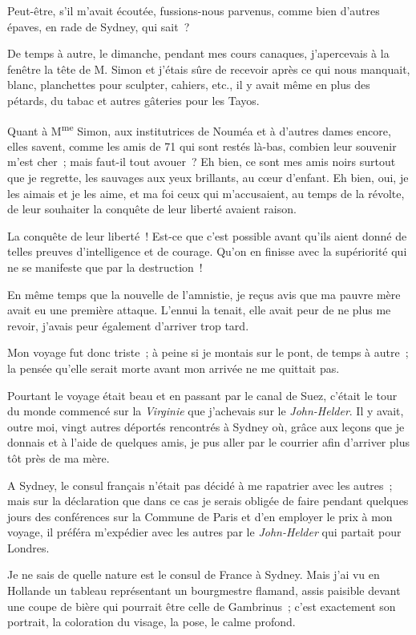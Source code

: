 \documentclass[french,twoside]{book} %
\begin{document}
Peut-être, s’il m’avait écoutée, fussions-nous parvenus, comme bien d’autres épaves, en rade de Sydney, qui sait ?\par
De temps à autre, le dimanche, pendant mes cours canaques, j’apercevais à la fenêtre la tête de M. Simon et j’étais sûre de recevoir après ce qui nous manquait, blanc, planchettes pour sculpter, cahiers, etc., il y avait même en plus des pétards, du tabac et autres gâteries pour les Tayos.\par
Quant à M\textsuperscript{me} Simon, aux institutrices de Nouméa et à d’autres dames encore, elles savent, comme les amis de 71 qui sont restés là-bas, combien leur souvenir m’est cher ; mais faut-il tout avouer ? Eh bien, ce sont mes amis noirs surtout que je regrette, les sauvages aux yeux brillants, au cœur d’enfant. Eh bien, oui, je les aimais et je les aime, et ma foi ceux qui m’accusaient, au temps de la révolte, de leur souhaiter la conquête de leur liberté avaient raison.\par
La conquête de leur liberté ! Est-ce que c’est possible avant qu’ils aient donné de telles preuves d’intelligence et de courage. Qu’on en finisse avec la supériorité qui ne se manifeste que par la destruction !\par
 En même temps que la nouvelle de l’amnistie, je reçus avis que ma pauvre mère avait eu une première attaque. L’ennui la tenait, elle avait peur de ne plus me revoir, j’avais peur également d’arriver trop tard.\par
Mon voyage fut donc triste ; à peine si je montais sur le pont, de temps à autre ; la pensée qu’elle serait morte avant mon arrivée ne me quittait pas.\par
Pourtant le voyage était beau et en passant par le canal de Suez, c’était le tour du monde commencé sur la \emph{Virginie} que j’achevais sur le \emph{John-Helder}. Il y avait, outre moi, vingt autres déportés rencontrés à Sydney où, grâce aux leçons que je donnais et à l’aide de quelques amis, je pus aller par le courrier afin d’arriver plus tôt près de ma mère.\par
A Sydney, le consul français n’était pas décidé à me rapatrier avec les autres ; mais sur la déclaration que dans ce cas je serais obligée de faire pendant quelques jours des conférences sur la Commune de Paris et d’en employer le prix à mon voyage, il préféra m’expédier avec les autres par le \emph{John-Helder} qui partait pour Londres.\par
Je ne sais de quelle nature est le consul de France à Sydney. Mais j’ai vu en Hollande un tableau représentant un bourgmestre flamand,  assis paisible devant une coupe de bière qui pourrait être celle de Gambrinus ; c’est exactement son portrait, la coloration du visage, la pose, le calme profond.\par
\end{document}
